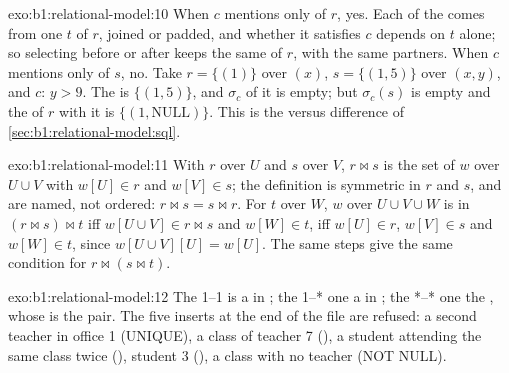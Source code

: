\begin{solution}{exo:b1:relational-model:10}
When $c$ mentions only  of $r$, yes. Each  of the  comes from one  $t$ of $r$, joined or
padded, and whether it satisfies $c$ depends on $t$ alone; so selecting before or after keeps the same  of $r$, with
the same partners. When $c$ mentions only  of $s$, no. Take $r = \{(1)\}$ over $(x)$, $s = \{(1, 5)\}$ over $(x,
y)$, and $c$: $y > 9$. The  is $\{(1, 5)\}$, and $\sigma_c$ of it is empty; but $\sigma_c(s)$ is empty and
the  of $r$ with it is $\{(1, \text{NULL})\}$. This is the  versus  difference of
\cref{sec:b1:relational-model:sql}.
\end{solution}

\begin{solution}{exo:b1:relational-model:11}
With $r$ over $U$ and $s$ over $V$, $r \bowtie s$ is the set of  $w$ over $U \cup V$ with $w[U] \in r$ and $w[V] \in
s$; the definition is symmetric in $r$ and $s$, and  are named, not ordered: $r \bowtie s = s \bowtie r$. For
$t$ over $W$, $w$ over $U \cup V \cup W$ is in $(r \bowtie s) \bowtie t$ iff $w[U \cup V] \in r \bowtie s$ and $w[W] \in
t$, iff $w[U] \in r$, $w[V] \in s$ and $w[W] \in t$, since $w[U \cup V][U] = w[U]$. The same steps give the same condition
for $r \bowtie (s \bowtie t)$.
\end{solution}

\begin{solution}{exo:b1:relational-model:12}
The 1--1  is a   in ; the 1--* one a  
in ; the *--* one the  , whose  is the pair. The five inserts at
the end of the file are refused: a second teacher in office 1 (UNIQUE), a class of teacher 7 (), a student
attending the same class twice (), student 3 (), a class with no teacher (NOT NULL).
\end{solution}

